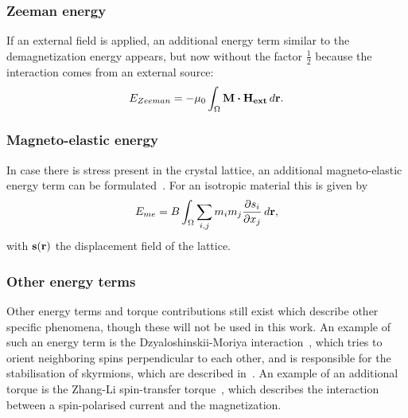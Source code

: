 \documentclass[10pt,a4paper]{article}
\begin{document}
\subsubsection{Zeeman energy}
If an external field is applied, an additional energy term similar to the demagnetization energy appears, but now without the factor $\frac{1}{2}$ because the interaction comes from an external source:
\begin{equation}
    E_{Zeeman} = -\mu_0 \int_\Omega \vb{M} \vdot \vb{H_{ext}} \, d\vb{r} \mathrm{.} \label{eq:Energy_Term_Zeeman}
\end{equation}

\subsubsection{Magneto-elastic energy}
In case there is stress present in the crystal lattice, an additional magneto-elastic energy term can be formulated~\cite{Gilbert1956}. For an isotropic material this is given by
\begin{equation}
    E_{me} = B \int_\Omega \sum_{i,j} m_i m_j \frac{\partial s_i}{\partial x_j} \,d\vb{r} \mathrm{,}
\end{equation}
with $\vb{s}(\vb{r})$ the displacement field of the lattice.

\subsubsection{Other energy terms}
Other energy terms and torque contributions still exist which describe other specific phenomena, though these will not be used in this work. An example of such an energy term is the Dzyaloshinskii-Moriya interaction~\cite{DzyaloshinskiiMoriya}, which tries to orient neighboring spins perpendicular to each other, and is responsible for the stabilisation of skyrmions, which are described in~\cite{skyrmions}. An example of an additional torque is the Zhang-Li spin-transfer torque~\cite{ZhangLiSpinTransferTorque}, which describes the interaction between a spin-polarised current and the magnetization.
\end{document}
